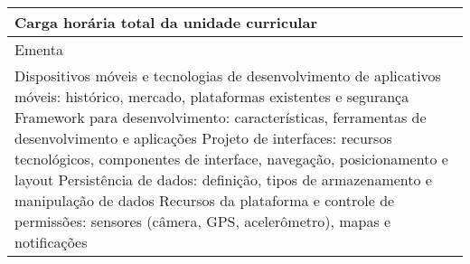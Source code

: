 \begin{quadro}[h!]
\begin{tabular}{|p{3cm} p{2cm} p{3cm} p{2cm} p{3cm} p{2cm}|}
\multicolumn{5}{|p{13cm}|}{\cellcolor{blue1} Carga horária total da unidade curricular} & \multicolumn{1}{p{1cm}|}{\raggedleft 60	}\\\hline
\multicolumn{6}{|p{15cm}|}{\cellcolor{blue1} Ementa} \\\hline
\hline\multicolumn{6}{|p{15cm}|}{\scriptsize Dispositivos móveis e tecnologias de desenvolvimento de aplicativos móveis: histórico, mercado, plataformas existentes e segurança Framework para desenvolvimento: características, ferramentas de desenvolvimento e aplicações Projeto de interfaces: recursos tecnológicos, componentes de interface, navegação, posicionamento e layout Persistência de dados: definição, tipos de armazenamento e manipulação de dados Recursos da plataforma e controle de permissões: sensores (câmera, GPS, acelerômetro), mapas e notificações}\\\hline
\hline
	\end{tabular}
\end{quadro}
